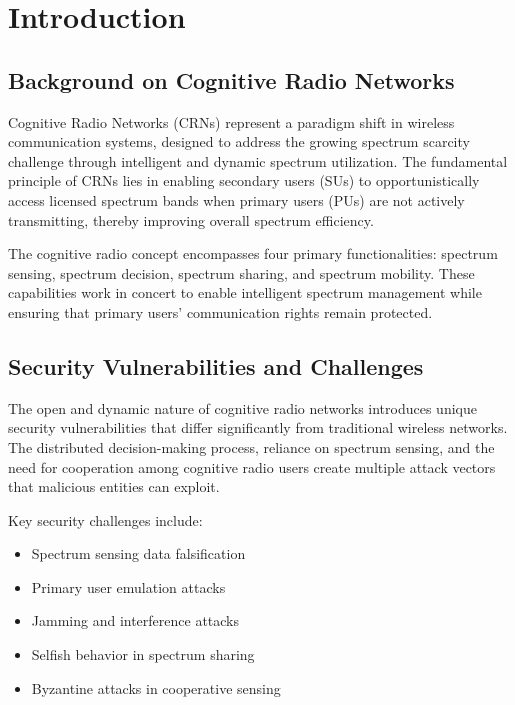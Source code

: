
\chapter{Introduction}

\section{Background on Cognitive Radio Networks}
Cognitive Radio Networks (CRNs) represent a paradigm shift in wireless communication systems, designed to address the growing spectrum scarcity challenge through intelligent and dynamic spectrum utilization. The fundamental principle of CRNs lies in enabling secondary users (SUs) to opportunistically access licensed spectrum bands when primary users (PUs) are not actively transmitting, thereby improving overall spectrum efficiency.

The cognitive radio concept encompasses four primary functionalities: spectrum sensing, spectrum decision, spectrum sharing, and spectrum mobility. These capabilities work in concert to enable intelligent spectrum management while ensuring that primary users' communication rights remain protected.

\section{Security Vulnerabilities and Challenges}
The open and dynamic nature of cognitive radio networks introduces unique security vulnerabilities that differ significantly from traditional wireless networks. The distributed decision-making process, reliance on spectrum sensing, and the need for cooperation among cognitive radio users create multiple attack vectors that malicious entities can exploit.

Key security challenges include:
\begin{itemize}
\item Spectrum sensing data falsification
\item Primary user emulation attacks
\item Jamming and interference attacks
\item Selfish behavior in spectrum sharing
\item Byzantine attacks in cooperative sensing
\end{itemize}

